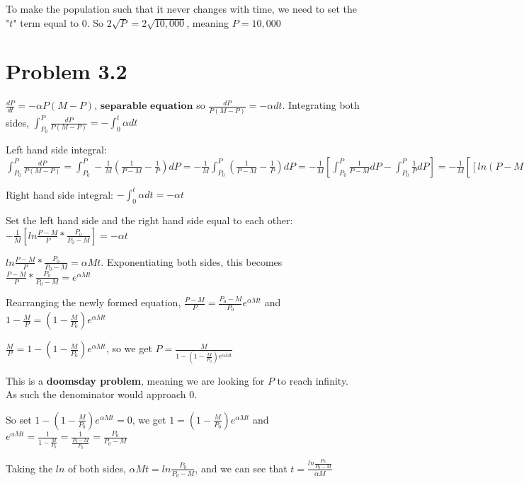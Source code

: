 \documentclass{article}
\begin{document}
\noindent To make the population such that it never changes with time, we need to set the "$t$" term equal to 0.  So $2\sqrt{P} = 2\sqrt{10,000}$, meaning $P = 10,000$ \par

\section{Problem 3.2}

\noindent $\frac{dP}{dt} = -\alpha P(M - P)$, $\textbf{separable equation}$ so $\frac{dP}{P(M - P)} = -\alpha dt$.  Integrating both sides, $\int_{P_{0}}^{P} \frac{dP}{P(M - P)} = -\int_{0}^{t} \alpha dt$ \par
\noindent Left hand side integral:  $\int_{P_{0}}^{P} \frac{dP}{P(M - P)} =  \int_{P_{0}}^{P} -\frac{1}{M} (\frac{1}{P - M} - \frac{1}{P}) dP = -\frac{1}{M} \int_{P_{0}}^{P} (\frac{1}{P - M} - \frac{1}{P}) dP = -\frac{1}{M} [\int_{P_{0}}^{P} \frac{1}{P - M} dP - \int_{P_{0}}^{P} \frac{1}{P} dP] = -\frac{1}{M} [[ln(P - M)]_{P_0}^{P} - [ln(P)]_{P_0}^{P}] = -\frac{1}{M}[ln \frac{P - M}{P_{0} - M} - ln \frac{P}{P_0}] = -\frac{1}{M} [ln \frac{P - M}{P_{0} - M} * \frac{P_{0}}{P}] = -\frac{1}{M} [ln \frac{P - M}{P} * \frac{P_{0}}{P_{0} - M}]$ \par
\noindent Right hand side integral: $-\int_{0}^{t}\alpha dt  = -\alpha t$ \par\vspace{0.25cm}

\noindent Set the left hand side and the right hand side equal to each other: $-\frac{1}{M}[ln \frac{P - M}{P} * \frac{P_{0}}{P_{0} - M}] = -\alpha t$ \par
\noindent $ln \frac{P - M}{P} * \frac{P_{0}}{P_{0} - M} = \alpha Mt$.  Exponentiating both sides, this becomes $\frac{P - M}{P} * \frac{P_{0}}{P_{0} - M} = e^{\alpha Mt}$ \par
\noindent Rearranging the newly formed equation, $\frac{P - M}{P} = \frac{P_{0} - M}{P_{0}}e^{\alpha Mt}$ and $1 - \frac{M}{P} = (1 - \frac{M}{P_{0}})e^{\alpha Mt}$ \par
\noindent $\frac{M}{P} = 1 - (1 - \frac{M}{P_{0}})e^{\alpha Mt}$, so we get $P = \frac{M}{1 - (1 - \frac{M}{P_{0}})e^{\alpha Mt}}$ \par\vspace{0.25cm}

\noindent This is a \textbf{doomsday problem}, meaning we are looking for $P$ to reach infinity.  As such the denominator would approach 0. \par
\noindent So set $1 - (1 - \frac{M}{P_{0}})e^{\alpha Mt} = 0$, we get $1 = (1 - \frac{M}{P_{0}})e^{\alpha Mt}$ and $e^{\alpha Mt} = \frac{1}{1 - \frac{M}{P_{0}}} = \frac{1}{\frac{P_{0} - M}{P_{0}}} = \frac{P_{0}}{P_{0} - M}$ \par
\noindent Taking the $ln$ of both sides, $\alpha Mt = ln \frac{P_{0}}{P_{0} - M}$, and we can see that $t = \frac{ln \frac{P_{0}}{P_{0} - M}}{\alpha M}$
\end{document}
